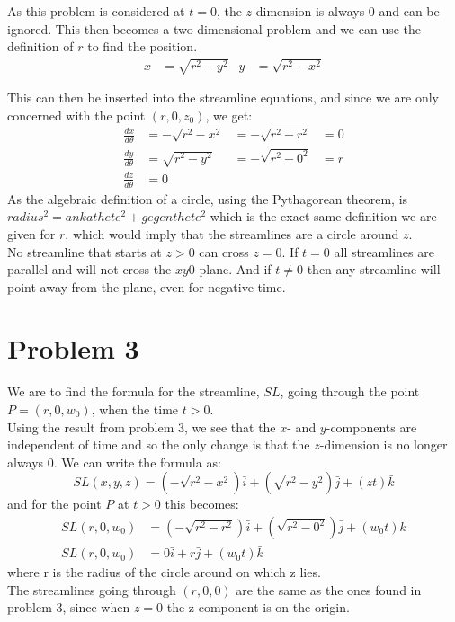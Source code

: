\documentclass[11pt,a4paper,english]{article}
\numberwithin{equation}{section}
\begin{document}
As this problem is considered at $t=0$, the $z$ dimension is always 0 and can be ignored.
This then becomes a two dimensional problem and we can use the definition of $r$ to find the position.
\begin{align*}
	x &= \sqrt{r^2 - y^2}	& 
	y &= \sqrt{r^2 - x^2}
\end{align*}

This can then be inserted into the streamline equations, and since we are only concerned with the point $(r, 0, z_{0})$, we get:
\begin{align*}
	\frac{dx}{d\theta} &= -\sqrt{r^2 - x^2} &= -\sqrt{r^2 - r^2} &= 0 	\\
	\frac{dy}{d\theta} &=  \sqrt{r^2 - y^2} &= -\sqrt{r^2 - 0^2} &= r	\\
	\frac{dz}{d\theta} &=  0
\end{align*}
As the algebraic definition of a circle, using the Pythagorean theorem, is $radius^2 = ankathete^2 + gegenthete^2$ 
which is the exact same definition we are given for $r$, which would imply that the streamlines are a circle around $z$.
\\
No streamline that starts at $z > 0$ can cross $z = 0$. If $t=0$ all streamlines are parallel and will not cross the $xy0$-plane. And if $t \neq 0$ then any streamline will point away from the plane, even for negative time.

\section{Problem 3}
We are to find the formula for the streamline, $SL$, going through the point $P = (r, 0, w_{0})$, when the time $t > 0$. \\
Using the result from problem 3, we see that the $x$- and $y$-components are independent of time and so the only change is that the $z$-dimension is no longer always 0. 
We can write the formula as:
$$ SL(x, y, z) = (-\sqrt{r^2 - x^2})\bar{i} + (\sqrt{r^2 - y^2})\bar{j} + (zt)\bar{k}$$
and for the point $P$ at $t > 0$ this becomes:
\begin{align*}
SL(r, 0, w_{0}) &=(-\sqrt{r^2 - r^2})\bar{i} + (\sqrt{r^2 - 0^2})\bar{j} + (w_{0}t)\bar{k}	\\
SL(r, 0, w_{0}) &=0\bar{i} + r\bar{j} + (w_{0}t)\bar{k}
\end{align*}
where r is the radius of the circle around on which z lies.
\\
The streamlines going through $(r, 0, 0)$ are the same as the ones found in problem 3, since when $z=0$ the z-component is on the origin.
\end{document}
